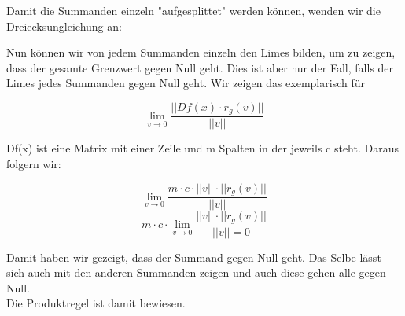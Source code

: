 Damit die Summanden einzeln "aufgesplittet" werden können, wenden wir die Dreiecksungleichung %
an:

Nun können wir von jedem Summanden einzeln den Limes bilden, um zu zeigen, dass der gesamte Grenzwert gegen Null geht. Dies ist aber nur der Fall, falls der Limes jedes Summanden gegen Null geht. Wir zeigen das exemplarisch für 

\begin{equation} \lim\limits_{v \rightarrow 0} \frac{||Df(x) \cdot r_{g}(v)||}{||v||} \end{equation}

Df(x) ist eine Matrix mit einer Zeile und m Spalten in der jeweils c steht. Daraus folgern wir:

\begin{equation} \lim\limits_{v \rightarrow 0} \frac{m \cdot c \cdot ||v|| \cdot ||r_{g}(v)||}{||v||} \end{equation}
\begin{equation}m \cdot c \cdot \lim\limits_{v \rightarrow 0} \frac{ ||v|| \cdot ||r_{g}(v)||}{||v|| = 0} \end{equation} 

Damit haben wir gezeigt, dass der Summand gegen Null geht. Das Selbe lässt sich auch mit den anderen Summanden zeigen und auch diese gehen alle gegen Null. \\
Die Produktregel ist damit bewiesen.